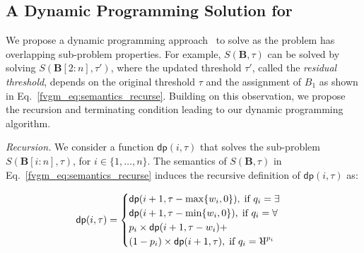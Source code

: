 \iffalse
\red{The decision version of computing the maximum (minimum) PPV is to decide whether there is an assignment of \textit{sensitive} or \textit{choice variables}, for which the \textit{non-sensitive} or \textit{chance variables} yield a PPV greater or less than $\alpha \in [0,1]$. Now, we formally state the hardness of verifying linear classifiers followed by an efficient dynamic programming solution.
\begin{lemma}
	\label{fvgm_lm:hardness}
	The decision version of the fairness verification problem for linear classifiers is in $\mathrm{NP^{PP}}$.
\end{lemma}}
\fi

 
 
 \subsection{A Dynamic Programming Solution for {\stochastic}}
 \label{fvgm_sec:dp_formulation}

We propose a dynamic programming approach~\cite{pisinger1999linear,woeginger1992equal} to solve {\stochastic} as the problem has overlapping sub-problem properties. 
For example, $S(\mathbf{B}, \tau)$ can be solved by solving $S(\mathbf{B}[2:n], \tau')$, where the updated threshold $\tau'$, called the \textit{residual threshold}, depends on the original threshold $\tau$ and the assignment of $B_1$ as shown in Eq.~\eqref{fvgm_eq:semantics_recurse}.
Building on this observation, we propose the recursion and terminating condition leading to our dynamic programming algorithm. 

\textit{Recursion.} We consider a function $ \mathsf{dp}(i, \tau) $ that solves the sub-problem $ S(\mathbf{B}[i:n],\tau)  $, for $ i \in \{1,\ldots,n\}  $. The semantics of  $ S(\mathbf{B},\tau) $ in Eq.~\eqref{fvgm_eq:semantics_recurse} induces the recursive definition of $ \mathsf{dp}(i,\tau) $ as: 

\begin{align}\label{fvgm_eq:dp_recurse}
 \mathsf{dp}(i,\tau)=
 \begin{cases}
 \mathsf{dp}(i+1, \tau-\max\{w_i, 0\}), \; \text{if } q_i = \exists\\
 \mathsf{dp}(i+1, \tau-\min\{w_i, 0\}), \; \text{if } q_i = \forall\\
 p_i \times \mathsf{dp}(i+1, \tau-w_i) + \\ (1- p_i) \times \mathsf{dp}(i+1, \tau) ,\; \text{if } q_i = \R^{p_i}
 \end{cases}
\end{align} 

